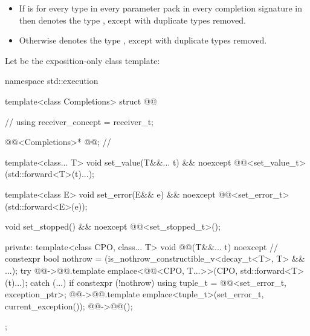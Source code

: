 \begin{itemize}
\item
If  is 
for every type 
in every parameter pack 
in every completion signature 
in  then
 denotes the type
,
except with duplicate types removed.

\item
Otherwise
 denotes the type
,
except with duplicate types removed.
\end{itemize}

\pnum
Let  be the exposition-only class template:

%
\begin{codeblock}
namespace std::execution {
  template<class Completions>
  struct @@ {                                // \expos
    using receiver_concept = receiver_t;

    @@<Completions>* @@;                // \expos

    template<class... T>
      void set_value(T&&... t) && noexcept {
        @@<set_value_t>(std::forward<T>(t)...);
      }

    template<class E>
      void set_error(E&& e) && noexcept {
       @@<set_error_t>(std::forward<E>(e));
      }

    void set_stopped() && noexcept {
       @@<set_stopped_t>();
    }

  private:
    template<class CPO, class... T>
      void @@(T&&... t) noexcept {                    // \expos
        constexpr bool nothrow = (is_nothrow_constructible_v<decay_t<T>, T> && ...);
        try {
          @@->@@.template emplace<@@<CPO, T...>>(CPO{},
                                                                   std::forward<T>(t)...);
        }
        catch (...) {
          if constexpr (!nothrow) {
            using tuple_t = @@<set_error_t, exception_ptr>;
            @@->@@.template emplace<tuple_t>(set_error_t{}, current_exception());
          }
        }
        @@->@@();
      }
  };
}
\end{codeblock}


